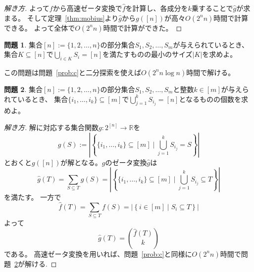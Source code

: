 \documentclass[a4paper,twoside,onecolumn,openany,article,10pt]{memoir}
\theoremstyle{definition}
\newtheorem{problem}{問題}
\theoremstyle{remark}
\begin{document}
\begin{proof}[解き方]
よって$f$から高速ゼータ変換で$\widehat{f}$を計算し、各成分を$k$乗することで$\widehat{g}$が求まる。
そして定理~\ref{thm:mobius}より$\widehat{g}$から$g([n])$が高々$O(2^nn)$時間で計算できる。
よって全体で$O(2^n n)$時間で計算ができた。
\end{proof}




\begin{problem}
集合$[n]:=\{1,2,\dotsc,n\}$の部分集合$S_1,S_2,\dotsc,S_m$が与えられているとき、
集合$K\subseteq[n]$で$\bigcup_{i\in K} S_{i}=[n]$を満たすものの最小のサイズ$|K|$を求めよ。
\end{problem}
この問題は問題~\ref{prob:c}と二分探索を使えば$O(2^n n\log n )$時間で解ける。

\begin{problem}\label{prob:s}
集合$[n]:=\{1,2,\dotsc,n\}$の部分集合$S_1,S_2,\dotsc,S_m$と整数$k\in[m]$が与えられているとき、
集合$\{i_1,\dotsc,i_k\}\subseteq [m]$で$\bigcup_{j=1}^k S_{i_j}=[n]$となるものの個数を求めよ。
\end{problem}
\begin{proof}[解き方]
解に対応する集合関数$g\colon 2^{[n]}\to\mathbb{R}$を
\begin{equation*}
g(S) := \left|\left\{\{i_1,\dotsc,i_k\}\subseteq[m] \mid \bigcup_{j=1}^k S_{i_j}=S\right\}\right|
\end{equation*}
とおくと$g([n])$が解となる。$g$のゼータ変換$\widehat{g}$は
\begin{equation*}
\widehat{g}(T) = \sum_{S\subseteq T}g(S) =
\left|\left\{\{i_1,\dotsc,i_k\}\subseteq[m] \mid \bigcup_{j=1}^k S_{i_j}\subseteq T\right\}\right|
\end{equation*}
を満たす。
一方で
\begin{equation*}
\widehat{f}(T) = \sum_{S\subseteq T}f(S) =
\left|\left\{i\in[m] \mid S_i\subseteq T\right\}\right|
\end{equation*}
よって
\begin{equation*}
\widehat{g}(T) = \binom{\widehat{f}(T)}{k}
\end{equation*}
である。
高速ゼータ変換を用いれば、問題~\ref{prob:c}と同様に$O(2^nn)$時間で問題~\ref{prob:s}が解ける.
\end{proof}

\end{document}
